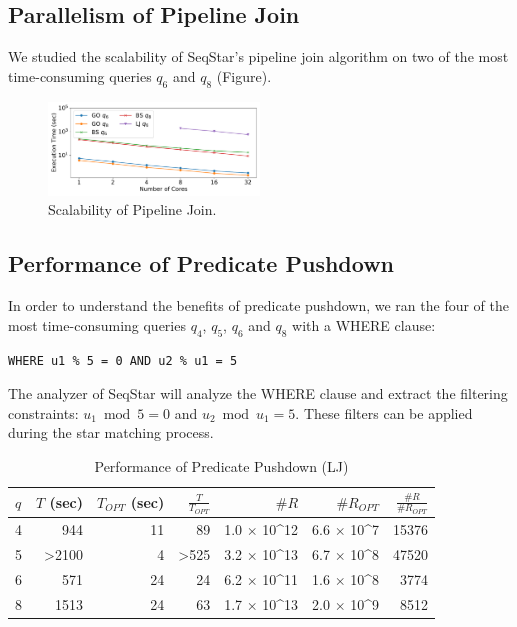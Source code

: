 \subsection{Parallelism of Pipeline Join}\label{sec:experiments_join}
We studied the scalability of SeqStar's pipeline join algorithm on two of the most time-consuming queries $q_6$ and $q_8$ (Figure).

\begin{figure}[ht]
  \centering
  \includegraphics[width=0.5\textwidth]{img/exp_scalability.pdf}
  \caption{Scalability of Pipeline Join.}\label{img:exp_scalability}
\end{figure}

\subsection{Performance of Predicate Pushdown}
In order to understand the benefits of predicate pushdown,
we ran the four of the most time-consuming queries $q_4$, $q_5$, $q_6$ and $q_8$ with a WHERE clause:
\begin{Verbatim}[fontsize=\small]
  WHERE u1 % 5 = 0 AND u2 % u1 = 5
\end{Verbatim}
The analyzer of SeqStar will analyze the WHERE clause and extract the filtering constraints:
$u_1 \bmod 5 = 0$ and $u_2 \bmod u_1 = 5$.
These filters can be applied during the star matching process.

\begin{table}
  \caption{Performance of Predicate Pushdown (LJ)}\label{tab:pushdown_lj}
  \begin{tabular}{lrrrrrr}
    \toprule
    $q$ & \parbox{5mm}{$T$ (sec)} & \parbox{5mm}{$T_{OPT}$ (sec)} & $\frac{T}{T_{OPT}}$ & $\#R$ & $\#R_{OPT}$ & $\frac{\#R}{\#R_{OPT}}$ \\
     &   944 &        11 &       89 &   1.0 $\times$ 10^{12} &   6.6 $\times$ 10^7 &     15376 \\
    5 & >2100 &         4 &     >525 &  3.2 $\times$ 10^{13}  &   6.7 $\times$ 10^8 &     47520 \\
    6 &   571 &        24 &       24 &   6.2 $\times$ 10^{11} &   1.6 $\times$ 10^8 &      3774 \\
    8 &  1513 &        24 &       63 &   1.7 $\times$ 10^{13} &    2.0 $\times$ 10^9&      8512 \\
    \bottomrule
  \end{tabular}
\end{table}

